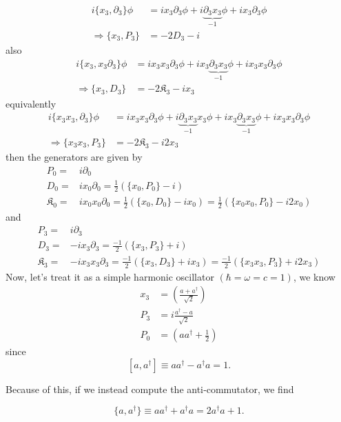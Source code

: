 \documentclass[]{article}
\numberwithin{equation}{section}
\begin{document}
{{\begin{align}
    i\{x_{3},\partial_{3}\}\phi&=ix_{3}\partial_{3}\phi+i\underbrace{\partial_{3}x_{3}}_{-1}\phi+ix_{3}\partial_{3}\phi\\
    \Longrightarrow \{x_{3},P_{3}\}&=-2D_{3}-i
\end{align}
also
\begin{align}
    i\{x_{3},x_{3}\partial_{3}\}\phi&=ix_{3}x_{3}\partial_{3}\phi+ix_{3}\underbrace{\partial_{3}x_{3}}_{-1}\phi+ix_{3}x_{3}\partial_{3}\phi\\
    \Longrightarrow \{x_{3},D_{3}\}&=-2\mathfrak{K}_{3}-ix_{3}
\end{align}
equivalently 
\begin{align}
    i\{x_{3}x_{3},\partial_{3}\}\phi&=ix_{3}x_{3}\partial_{3}\phi+i\underbrace{\partial_{3}x_{3}}_{-1}x_{3}\phi+ix_{3}\underbrace{\partial_{3}x_{3}}_{-1}\phi+ix_{3}x_{3}\partial_{3}\phi\\
    \Longrightarrow \{x_{3}x_{3},P_{3}\}&=-2\mathfrak{K}_{3}-i2x_{3}
\end{align}
then the generators are given by
\begin{align}
    P_{0}=&i\partial_{0}\\
    D_{0}=&ix_{0}\partial_{0}=\frac{1}{2}\left(\{x_{0},P_{0}\}-i\right)\\
    \mathfrak{K}_{{0}}=&ix_{0}x_{0}\partial_{{0}}=\frac{1}{2}\left(\{x_{0},D_{0}\}-ix_{0}\right)=\frac{1}{2}\left(\{x_{0}x_{0},P_{0}\}-i2x_{0}\right)
\end{align}
and
\begin{align}
    P_{3}=&i\partial_{3}\\
    D_{3}=&-ix_{3}\partial_{3}=\frac{-1}{2}\left(\{x_{3},P_{3}\}+i\right)\\
    \mathfrak{K}_{{3}}=&-ix_{3}x_{3}\partial_{{3}}=\frac{-1}{2}\left(\{x_{3},D_{3}\}+ix_{3}\right)=\frac{-1}{2}\left(\{x_{3}x_{3},P_{3}\}+i2x_{3}\right)
\end{align}
Now, let's treat it as a simple harmonic oscillator $(\hbar=\omega=c=1)$, we know
\begin{align}
    x_3&=\left(\frac{a+a^{\dagger}}{\sqrt{2}}\right)\\
    P_3&=i\frac{a^{\dagger}-a}{\sqrt{2}}\\
    P_0&=\left(a a^{\dagger}+\frac{1}{2}\right)
\end{align}
since
\[
[a, a^\dagger] \equiv a a^\dagger - a^\dagger a = 1.
\]

Because of this, if we instead compute the anti‐commutator, we find

\[
\{a, a^\dagger\} \equiv a a^\dagger + a^\dagger a = 2a^\dagger a + 1.
\]

}}
\end{document}
